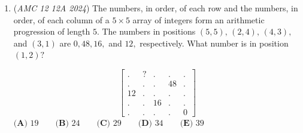 \begin{enumerate}
 \begin{align*} f(2a-x) &= f(x) \\ e^{2a-x+1} + e^{-(2a-x)} - 2  &= e^{x+1} + e^{-x} - 2   \end{align*}


 Analyzing the terms $e^{2a-x+1}$ and $e^{-x}$ tells us that $2a+1 = 0$

 This reveals that $a = -1/2$

 
Finally, point $(-1, 1/2)$ reflected over the axis $x=-1/2$ is the point $\boxed{\textbf{(D) }\left(0,\dfrac12\right)}$




\textbf{Solution 8}

First identify that the graphs are both forms of the parent function $e^x$ and will not have a slant asymptote, so we can eliminate answer choices with a different y-value and the same x-value as this function can not have different y value for a same x value. 

 The answer choices that we can still consider are: $\qquad\textbf{(D) }\left(0,\frac{1}{2}\right)\qquad\textbf{(E) }\left(3,\frac{1}{2}\right)$

 Remember that the constant term does not matter for an axis of symmetry, as it simply shifts the function(s) up or down.

 Hence, we can use the answer choices and plug in valid values of $x$ for $e^{x+1}=e^{-x}$.

 The answer for $x$ is then ${-1/2}$, and the answer is $\boxed{\textbf{(D) }\left(0,\dfrac12\right)}$




\textbf{Solution 9 (Fakesolve)}

Take $x+1=-x$. This gives $x=-\frac{1}{2}$. We reflect the x-value $-1$ over this, so the x-value of the answer is $0$, giving $\boxed{\textbf{(D) }\left(0,\dfrac12\right)}$.

 


	\item (\textit{AMC 12 12A 2024}) The numbers, in order, of each row and the numbers, in order, of each column of a $5 \times 5$ array of integers form an arithmetic progression of length $5{.}$ The numbers in positions $(5, 5), \,(2,4),\,(4,3),$ and $(3, 1)$ are $0, 48, 16,$ and $12{,}$ respectively. What number is in position $(1, 2)?$

 \[\begin{bmatrix} . & ? &.&.&. \\ .&.&.&48&.\\ 12&.&.&.&.\\ .&.&16&.&.\\ .&.&.&.&0\end{bmatrix}\]
$\textbf{(A) } 19 \qquad \textbf{(B) } 24 \qquad \textbf{(C) } 29 \qquad \textbf{(D) } 34 \qquad \textbf{(E) } 39$


\end{enumerate}
